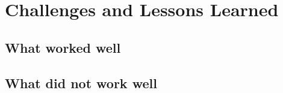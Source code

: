 \chapter{Challenges and Lessons Learned}\label{text}

\section[What worked well]{What worked well}\label{sec:newsec}
\section[What did not work well ]{What did not work well }\label{sec:newsec}
